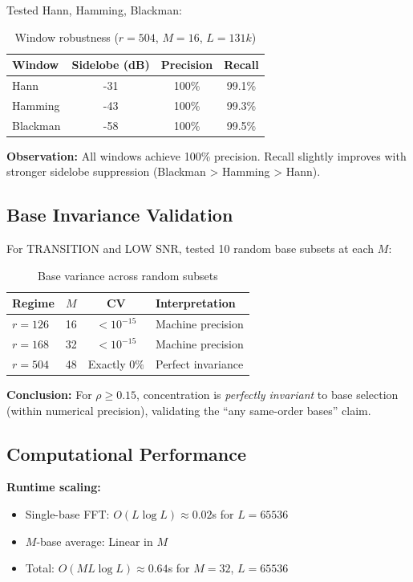 Tested Hann, Hamming, Blackman:

\begin{table}[h]
\centering
\begin{tabular}{@{}lccc@{}}
\toprule
Window & Sidelobe (dB) & Precision & Recall \\
\midrule
Hann & -31 & 100\% & 99.1\% \\
Hamming & -43 & 100\% & 99.3\% \\
Blackman & -58 & 100\% & 99.5\% \\
\bottomrule
\end{tabular}
\caption{Window robustness ($r=504$, $M=16$, $L=131k$)}
\end{table}

\textbf{Observation:} All windows achieve 100\% precision. Recall slightly improves with stronger sidelobe suppression (Blackman > Hamming > Hann).

\subsection{Base Invariance Validation}

For TRANSITION and LOW SNR, tested 10 random base subsets at each $M$:

\begin{table}[h]
\centering
\begin{tabular}{@{}lccl@{}}
\toprule
Regime & $M$ & CV & Interpretation \\
\midrule
$r=126$ & 16 & $< 10^{-15}$ & Machine precision \\
$r=168$ & 32 & $< 10^{-15}$ & Machine precision \\
$r=504$ & 48 & Exactly $0\%$ & Perfect invariance \\
\bottomrule
\end{tabular}
\caption{Base variance across random subsets}
\end{table}

\textbf{Conclusion:} For $\rho \geq 0.15$, concentration is \emph{perfectly invariant} to base selection (within numerical precision), validating the ``any same-order bases'' claim.

\subsection{Computational Performance}

\textbf{Runtime scaling:}
\begin{itemize}
    \item Single-base FFT: $O(L \log L) \approx 0.02$s for $L=65536$
    \item $M$-base average: Linear in $M$
    \item Total: $O(ML \log L) \approx 0.64$s for $M=32$, $L=65536$
\end{itemize}

